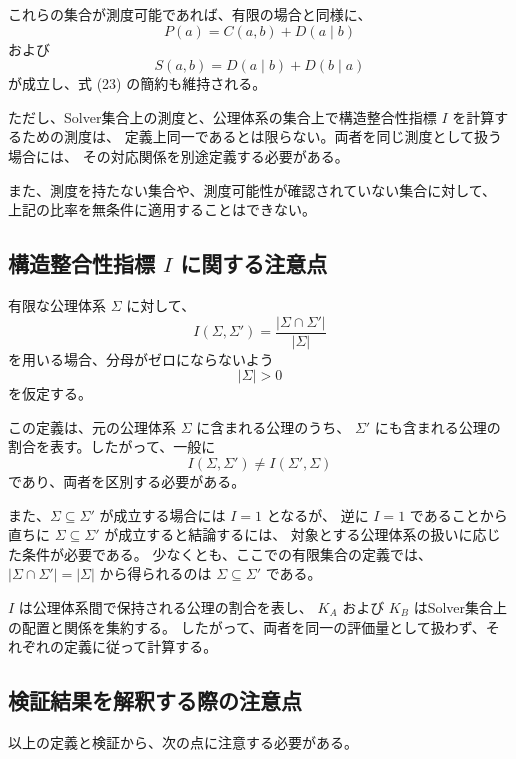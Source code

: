 \documentclass[a4paper,11pt]{ltjsarticle}
\begin{document}
これらの集合が測度可能であれば、有限の場合と同様に、
\[
P(a)=C(a,b)+D(a\mid b)
\]
および
\[
S(a,b)=D(a\mid b)+D(b\mid a)
\]
が成立し、式 (23) の簡約も維持される。

ただし、Solver集合上の測度と、公理体系の集合上で構造整合性指標 $I$ を計算するための測度は、
定義上同一であるとは限らない。両者を同じ測度として扱う場合には、
その対応関係を別途定義する必要がある。

また、測度を持たない集合や、測度可能性が確認されていない集合に対して、
上記の比率を無条件に適用することはできない。

\subsection{構造整合性指標 $I$ に関する注意点}

有限な公理体系 $\Sigma$ に対して、
\[
I(\Sigma,\Sigma')
=\frac{|\Sigma\cap\Sigma'|}{|\Sigma|}
\]
を用いる場合、分母がゼロにならないよう
\[
|\Sigma|>0
\]
を仮定する。

この定義は、元の公理体系 $\Sigma$ に含まれる公理のうち、
$\Sigma'$ にも含まれる公理の割合を表す。したがって、一般に
\[
I(\Sigma,\Sigma')\ne I(\Sigma',\Sigma)
\]
であり、両者を区別する必要がある。

また、$\Sigma\subseteq\Sigma'$ が成立する場合には $I=1$ となるが、
逆に $I=1$ であることから直ちに $\Sigma\subseteq\Sigma'$ が成立すると結論するには、
対象とする公理体系の扱いに応じた条件が必要である。
少なくとも、ここでの有限集合の定義では、
$|\Sigma\cap\Sigma'|=|\Sigma|$ から得られるのは
$\Sigma\subseteq\Sigma'$ である。

$I$ は公理体系間で保持される公理の割合を表し、
$K_A$ および $K_B$ はSolver集合上の配置と関係を集約する。
したがって、両者を同一の評価量として扱わず、それぞれの定義に従って計算する。

\subsection{検証結果を解釈する際の注意点}

以上の定義と検証から、次の点に注意する必要がある。
\end{document}

